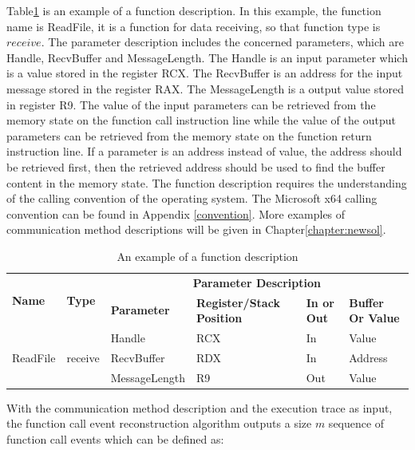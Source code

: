 Table\ref{functionexample} is an example of a function description. In this example, the function name is ReadFile, it is a function for data receiving, so that function type is $receive$. The parameter description includes the concerned parameters, which are Handle, RecvBuffer and MessageLength. The Handle is an input parameter which is a value stored in the register RCX. The RecvBuffer is an address for the input message stored in the register RAX. The MessageLength is a output value stored in register R9. The value of the input parameters can be retrieved from the memory state on the function call instruction line while the value of the output parameters can be retrieved from the memory state on the function return instruction line. If a parameter is an address instead of value, the address should be retrieved first, then the retrieved address should be used to find the buffer content in the memory state. The function description requires the understanding of the calling convention of the operating system. The Microsoft x64 calling convention can be found in Appendix \ref{convention}. More examples of communication method descriptions will be given in Chapter\ref{chapter:newsol}.

\begin{table}[H]
        \centering
        \caption{An example of a function description}
        \label{functionexample}
        \begin{tabular}{|l|l|l|l|l|l|}
            \hline
             \multirow{2}{*}{{\textbf{Name}}} & \multirow{2}{*}{{\textbf{Type}}} & \multicolumn{4}{c|}{\textbf{Parameter Description}}  \\
              \cline{3-6} 
             & & \textbf{Parameter}& \textbf{Register/Stack Position}& \textbf{In or Out} &  \textbf{Buffer Or Value}  \\
             \hline
             \multirow{3}{*}{ReadFile}
             &\multirow{3}{*}{receive} &  Handle & RCX & In & Value\\
              \cline{3-6} 
             & & RecvBuffer & RDX & In & Address\\
              \cline{3-6} 
             & & MessageLength & R9 & Out & Value\\
            \hline            
        \end{tabular}
    \end{table}

With the communication method description and the execution trace as input, the function call event reconstruction algorithm outputs a size $m$ sequence of function call events which can be defined as:

